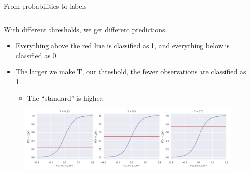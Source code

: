 \documentclass[aspectratio=169]{../latex_main/tntbeamer}  %
\begin{document}
	
	
	\begin{frame}{From probabilities to labels}
	    \begin{columns}
	        \begin{column}{.7\textwidth}
	                With different thresholds, we get different predictions.
	                \begin{itemize}
	                    \item Everything above the red line is classified as 1, and everything below is classified as 0.
	                    \item The larger we make T, our threshold, the fewer observations are classified as 1.
	                    \begin{itemize}
	                        \item The “standard” is higher.
	                    \end{itemize}
	                \end{itemize}
	                \begin{figure}
	                    \centering
	                    \includegraphics[scale=.5]{Bild3}
	                \end{figure}
	        \end{column}
	        

\end{columns}
\end{frame}
\end{document}
